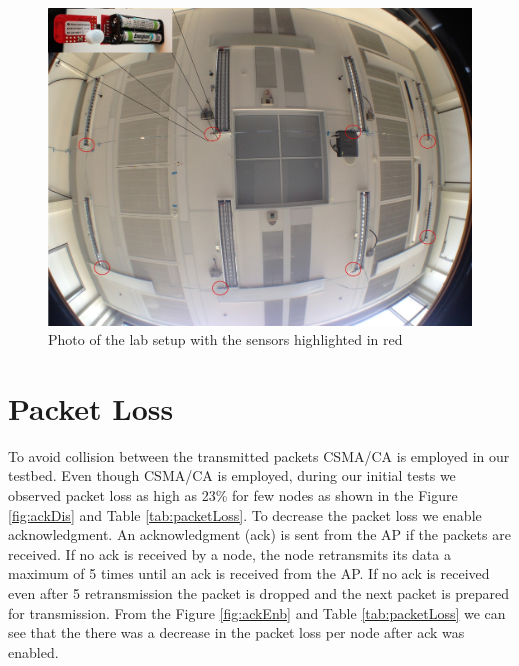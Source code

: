 \begin{figure}[!ht]
\includegraphics[scale=0.5]{./pics/lab_photo.jpg}
\caption{Photo of the lab setup with the sensors highlighted in red}
\label{fig:photo}
\end{figure}

\section{Packet Loss}
To avoid collision between the transmitted packets CSMA/CA is employed in our testbed. Even though CSMA/CA is employed, during our initial tests we observed packet loss as high as 23\% for few nodes as shown in the Figure \ref{fig:ackDis} and Table \ref{tab:packetLoss}. To decrease the packet loss we enable acknowledgment. An acknowledgment (ack) is sent from the AP if the packets are received. If no ack is received by a node, the node retransmits its data a maximum of 5 times until an ack is  received from the AP. If no ack is received even after 5 retransmission the packet is dropped and the next packet is prepared for transmission. From the Figure \ref{fig:ackEnb} and Table \ref{tab:packetLoss} we can see that the there was a decrease in the packet loss per node after ack was enabled. 

